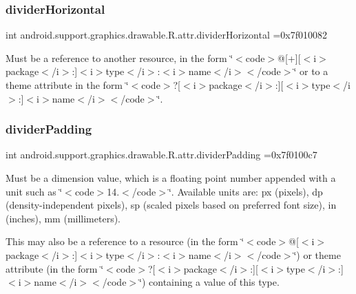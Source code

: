\subsubsection{\texorpdfstring{divider\+Horizontal}{dividerHorizontal}}
{\footnotesize\ttfamily int android.\+support.\+graphics.\+drawable.\+R.\+attr.\+divider\+Horizontal =0x7f010082\hspace{0.3cm}{\ttfamily [static]}}

Must be a reference to another resource, in the form \char`\"{}$<$code$>$@\mbox{[}+\mbox{]}\mbox{[}$<$i$>$package$<$/i$>$\+:\mbox{]}$<$i$>$type$<$/i$>$\+:$<$i$>$name$<$/i$>$$<$/code$>$\char`\"{} or to a theme attribute in the form \char`\"{}$<$code$>$?\mbox{[}$<$i$>$package$<$/i$>$\+:\mbox{]}\mbox{[}$<$i$>$type$<$/i$>$\+:\mbox{]}$<$i$>$name$<$/i$>$$<$/code$>$\char`\"{}. \mbox{\label{classandroid_1_1support_1_1graphics_1_1drawable_1_1R_1_1attr_a3c2e4b827f0c9c6ec0495d87d61b0215}} 
\subsubsection{\texorpdfstring{divider\+Padding}{dividerPadding}}
{\footnotesize\ttfamily int android.\+support.\+graphics.\+drawable.\+R.\+attr.\+divider\+Padding =0x7f0100c7\hspace{0.3cm}{\ttfamily [static]}}

Must be a dimension value, which is a floating point number appended with a unit such as \char`\"{}$<$code$>$14.\+5sp$<$/code$>$\char`\"{}. Available units are\+: px (pixels), dp (density-\/independent pixels), sp (scaled pixels based on preferred font size), in (inches), mm (millimeters). 

This may also be a reference to a resource (in the form \char`\"{}$<$code$>$@\mbox{[}$<$i$>$package$<$/i$>$\+:\mbox{]}$<$i$>$type$<$/i$>$\+:$<$i$>$name$<$/i$>$$<$/code$>$\char`\"{}) or theme attribute (in the form \char`\"{}$<$code$>$?\mbox{[}$<$i$>$package$<$/i$>$\+:\mbox{]}\mbox{[}$<$i$>$type$<$/i$>$\+:\mbox{]}$<$i$>$name$<$/i$>$$<$/code$>$\char`\"{}) containing a value of this type. \mbox{\label{classandroid_1_1support_1_1graphics_1_1drawable_1_1R_1_1attr_a5dd7c90a679e2d22830b86652162a7c9}} 
